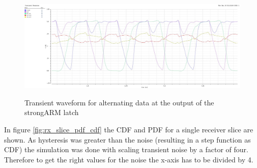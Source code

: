 \begin{figure}[H]
  \centering
  {\includegraphics[angle=90, scale=0.47]{img/output_alt_trans.jpg}}
  \caption{Transient waveform for alternating data at the output of the strongARM latch}
  \label{fig:strongARM_out}
\end{figure}

In figure \ref{fig:rx_slice_pdf_cdf} the CDF and PDF for a single receiver slice are shown. As hysteresis was greater than the noise (resulting in a step function as CDF) the simulation was done with scaling transient noise by a factor of four. Therefore to get the right values for the noise the x-axis has to be divided by 4.

